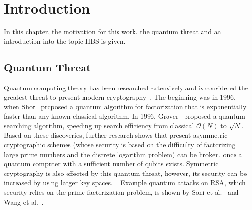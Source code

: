 \chapter{Introduction}
\label{cha:introduction}
In this chapter, the motivation for this work, the quantum threat and an introduction into the topic HBS is given.

\section{Quantum Threat}
Quantum computing theory has been researched extensively and is considered the greatest threat to present modern cryptography~\cite{impact_quantum_crypto_2018}.
The beginning was in 1996, when Shor~\cite{shors_algo_original_1999} proposed a quantum algorithm for factorization that is exponentially faster than any known classical algorithm. In 1996, Grover~\cite{grovers_algo_basispaper_1997} proposed a quantum searching algorithm, speeding up search efficiency from classical $\mathcal{O}(N)$ to $\sqrt{N}$. 
Based on these discoveries, further research shows that present asymmetric cryptographic schemes (whose security is based on the difficulty of factorizing large prime numbers and the discrete logarithm problem) can be broken, once a quantum computer with a sufficient number of qubits exists. 
Symmetric cryptography is also effected by this quantum threat, however, its security can be increased by using larger key spaces.
~\cite{impact_quantum_crypto_2018} %
Example quantum attacks on RSA, which security relies on the prime factorization problem, is shown by Soni et al.~\cite{RSA_pq-attack_examples_2018} and Wang et al.~\cite{RSA_pq-attack_without_factorization_2018}.





